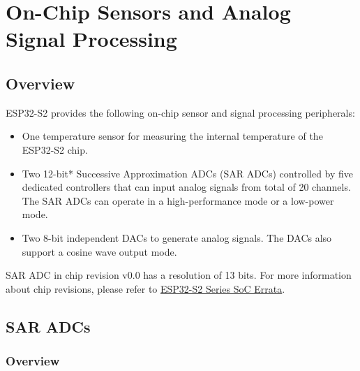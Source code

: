 \documentclass[main\_\_EN.tex]{subfiles}
\begin{document}

\ifglobal
\else
    {\let\clearpage\relax \listoftodos}
    \tableofcontents
\fi



\hypertarget{sensor}{}
\chapter{On-Chip Sensors and Analog Signal Processing}
\label{mod:sensor}


\section{Overview} \label{subsection:on-chip-sensor-overview}

ESP32-S2 provides the following on-chip sensor and signal processing peripherals:

\begin{itemize}

\item One temperature sensor for measuring the internal temperature of the ESP32-S2 chip.
\item Two 12-bit* Successive Approximation ADCs (SAR ADCs)  controlled by five dedicated controllers that can input analog signals from total of 20 channels. The SAR ADCs can operate in a high-performance mode or a low-power mode.
\item Two 8-bit independent DACs to  generate analog signals. The DACs also support a cosine wave output mode.
\end{itemize}

\begin{tiplisting}
SAR ADC in chip revision v0.0 has a resolution of 13 bits. For more information about chip revisions, please refer to \href{ https://espressif.com/sites/default/files/documentation/esp32-s2\_errata\_en.pdf}{ESP32-S2 Series SoC Errata}.
\end{tiplisting}
\section{SAR ADCs}\label{ssec:saradc}

\subsection{Overview}
\end{document}
